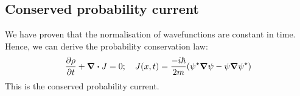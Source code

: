 \subsection{Conserved probability current}
We have proven that the normalisation of wavefunctions are constant in time.
Hence, we can derive the probability conservation law:
\[
	\pdv{\rho}{t}(x,t) + \div{J} = 0;\quad J(x,t) = \frac{-i\hbar}{2m} \qty(\psi^\star \grad{\psi} - \psi \grad{\psi^\star} )
\]
This is the conserved probability current.
